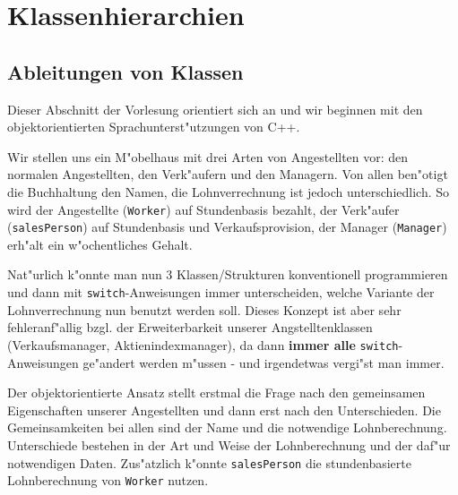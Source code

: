 %
\chapter{Klassenhierarchien}
\label{p:12}
% 
%
%
%
\section{Ableitungen von Klassen}
\label{sec:A1}
%
%
Dieser Abschnitt der Vorlesung orientiert sich an \cite[\S7]{Microsoft:1993:REC}
und wir beginnen mit den objektorientierten Sprachunterst"utzungen von C++.

Wir stellen uns ein M"obelhaus mit drei Arten von Angestellten vor:
den normalen Angestellten, den Verk"aufern und den Managern.
Von allen ben"otigt die Buchhaltung den Namen, die Lohnverrechnung
ist jedoch unterschiedlich.
So wird der Angestellte (\texttt{Worker}) auf Stundenbasis bezahlt,
der Verk"aufer (\texttt{salesPerson}) auf Stundenbasis  und Verkaufsprovision,
der Manager (\texttt{Manager}) erh"alt ein w"ochentliches Gehalt.

Nat"urlich k"onnte man nun 3 Klassen/Strukturen konventionell programmieren und
dann mit \verb|switch|-Anweisungen immer unterscheiden, welche Variante der Lohnverrechnung
nun benutzt werden soll. Dieses Konzept ist aber sehr fehleranf"allig bzgl. der
Erweiterbarkeit unserer Angstelltenklassen (Verkaufsmanager, Aktienindexmanager), da
dann \textbf{immer alle} \verb|switch|-Anweisungen ge"andert werden m"ussen -
und irgendetwas vergi"st man immer.

Der objektorientierte Ansatz stellt erstmal die Frage nach den gemeinsamen
Eigenschaften unserer Angestellten und dann erst nach den Unterschieden.
Die Gemeinsamkeiten bei allen sind der Name und die notwendige Lohnberechnung.
Unterschiede bestehen in der Art und Weise der Lohnberechnung und der daf"ur notwendigen
Daten. Zus"atzlich k"onnte \texttt{salesPerson} die stundenbasierte
Lohnberechnung von \texttt{Worker} nutzen.
%
